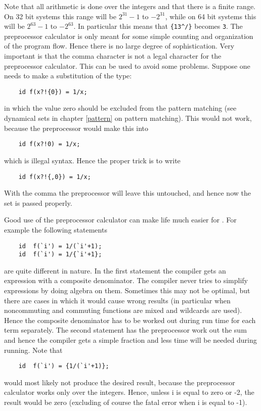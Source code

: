 Note that all arithmetic is done over the integers and 
that there is a finite range. On 32 bit systems this range 
will be $2^{31}-1$ to $-2^{31}$, while on 64 bit systems 
this will be  $2^{63}-1$ to $-2^{63}$. In particular this means that 
\verb:{13^/}: becomes \verb:3:. The preprocessor calculator is only meant 
for some simple counting and organization of the program flow. Hence there 
is no large degree of sophistication. Very important is that the 
comma character is not a legal character for the preprocessor 
calculator. This can be used to avoid some problems. Suppose one needs to 
make a substitution of the type:
\begin{verbatim}
    id f(x?!{0}) = 1/x;
\end{verbatim}
in which the value zero should be excluded from the pattern matching (see 
dynamical sets in chapter \ref{pattern} on pattern 
matching). This would not work, because the preprocessor would make this 
into
\begin{verbatim}
    id f(x?!0) = 1/x;
\end{verbatim}
which is illegal syntax. Hence the proper trick is to write
\begin{verbatim}
    id f(x?!{,0}) = 1/x;
\end{verbatim}
With the comma the preprocessor will leave this untouched, and hence now 
the set is passed properly.

Good use of the preprocessor calculator can make life much easier for 
\FORM. For example the following statements
\begin{verbatim}
    id  f(`i') = 1/(`i'+1);
    id  f(`i') = 1/{`i'+1};
\end{verbatim}
are quite different in nature. In the first statement the compiler gets an 
expression with a composite denominator. The compiler never tries to 
simplify expressions by doing algebra on them. Sometimes this may not be 
optimal, but there are cases in which it would cause wrong results (in 
particular when noncommuting and commuting functions are mixed and 
wildcards are used). Hence the composite denominator has to be worked out 
during run time for each term separately. The second statement has the 
preprocessor work out the sum and hence the compiler gets a simple fraction 
and less time will be needed during running. Note that
\begin{verbatim}
    id  f(`i') = {1/(`i'+1)};
\end{verbatim}
would most likely not produce the desired result, because the preprocessor 
calculator works only over the integers. Hence, unless i is equal to zero 
or -2, the result would be zero (excluding of course the fatal error when i 
is equal to -1).

